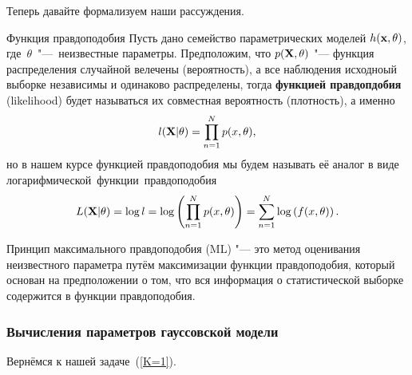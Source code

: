 
Теперь давайте формализуем наши рассуждения.
\begin{Def}{Функция правдоподобия}
Пусть дано семейство параметрических моделей $h({\bf x}, \theta)$, где~$\theta$~"---~неизвестные параметры. Предположим, что $p({\bf X}, \theta)$
"--- функция распределения случайной велечены (вероятность), а все наблюдения исходноый выборке независимы и одинаково распределены, тогда {\bf функцией правдопдобия} (likelihood) будет называться их совместная вероятность (плотность), а именно
\[
l({\bf X}|\theta) = \prod\limits_{n=1}^{N} p(x, \theta),
\]
но в нашем курсе функцией правдоподобия мы будем называть её аналог в виде логарифмической~функции~правдоподобия
\[
L({\bf X}|\theta) = \log l = \log \left( \prod\limits_{n=1}^{N} p(x, \theta)\right)
=
\sum\limits_{n = 1}^{N} \log \left( f(x, \theta) \right). 
\] 
\end{Def}

\begin{Def}{Принцип максимального правдоподобия (ML)} %
"--- это метод оценивания неизвестного параметра путём максимизации функции правдоподобия, который основан на предположении о том, что вся информация о статистической выборке содержится в функции правдоподобия. 
\end{Def}

\subsubsection{Вычисления параметров гауссовской модели}
Вернёмся к нашей задаче~(\ref{K=1}).

